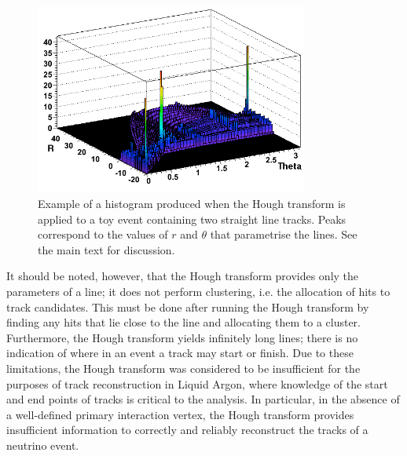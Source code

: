 \begin{figure}
    \centering
    \includegraphics[width=0.8\textwidth]{chapters/otheralg_images/hough-histogram}
    \caption{\label{fig:hough_histogram}Example of a histogram produced when the Hough transform is applied to a toy event containing two straight line tracks. Peaks correspond to the values of $r$ and $\theta$ that parametrise the lines. See the main text for discussion.}
\end{figure}

It should be noted, however, that the Hough transform provides only the parameters of a line; it does not perform clustering, i.e. the allocation of hits to track candidates. This must be done after running the Hough transform by finding any hits that lie close to the line and allocating them to a cluster. Furthermore, the Hough transform yields infinitely long lines; there is no indication of where in an event a track may start or finish. Due to these limitations, the Hough transform was considered to be insufficient for the purposes of track reconstruction in Liquid Argon, where knowledge of the start and end points of tracks is critical to the analysis. In particular, in the absence of a well-defined primary interaction vertex, the Hough transform provides insufficient information to correctly and reliably reconstruct the tracks of a neutrino event.


